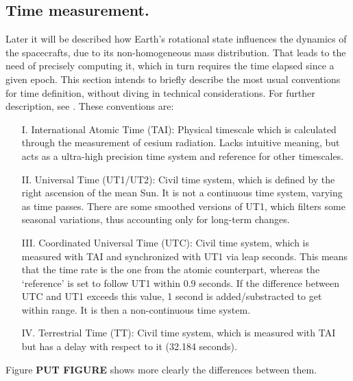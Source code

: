 	\subsection{Time measurement.}
	\indent Later it will be described how Earth's rotational state influences the dynamics of the spacecrafts, due to its non-homogeneous mass distribution. That leads to the need of precisely computing it, which in turn requires the time elapsed since a given epoch. This section intends to briefly describe the most usual conventions for time definition, without diving in technical considerations. For further description, see \cite{Time_handbook}. These conventions are:%
	\begin{itemize}
	\item[I.] International Atomic Time (TAI): Physical timescale which is calculated through the measurement of cesium radiation. Lacks intuitive meaning, but acts as a ultra-high precision time system and reference for other timescales.
	\item[II.] Universal Time (UT1/UT2): Civil time system, which is defined by the right ascension of the mean Sun. It is not a continuous time system, varying as time passes. There are some smoothed versions of UT1, which filters some seasonal variations, thus accounting only for long-term changes. 
	\item[III.] Coordinated Universal Time (UTC): Civil time system, which is measured with TAI and synchronized with UT1 via leap seconds. This means that the time rate is the one from the atomic counterpart, whereas the `reference' is set to follow UT1 within 0.9 seconds. If the difference between UTC and UT1 exceeds this value, 1 second is added/substracted to get within range. It is then a non-continuous time system.
	\item[IV.] Terrestrial Time (TT): Civil time system, which is measured with TAI but has a delay with respect to it (32.184 seconds).
	\end{itemize}
	\indent Figure \textbf{PUT FIGURE} shows more clearly the differences between them.
% 

